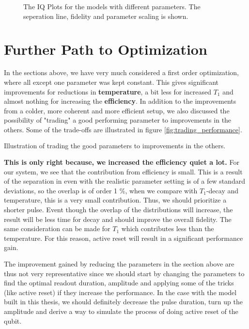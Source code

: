 \begin{figure}
    \caption{The IQ Plots for the models  with different parameters. The seperation line, fidelity and parameter scaling is shown.}
    \label{fig:budgetting_IQ_plots}
\end{figure}

\FloatBarrier

\section{Further Path to Optimization}
In the sections above, we have very much considered a first order optimization, where all except one parameter was kept constant. This gives significant improvements for reductions in \textbf{temperature}, a bit less for increased $T_1$ and almost nothing for increasing the \textbf{efficiency}. In addition to the improvements from a colder, more coherent and more efficient setup, we also discussed the possibility of "trading" a good performing parameter to improvements in the others. Some of the trade-offs are illustrated in figure \ref{fig:trading_performance}. 

\begin{marginfigure}[- 2 cm]
    \centering
    \caption{Illustration of trading the good parameters to improvements in the others. }
    \label{fig:trading_performance}
\end{marginfigure}

\textbf{This is only right because, we increased the efficiency quiet a lot.}
For our system, we see that the contribution from efficiency is small. This is a result of the separation in even with the realistic parameter setting is of a few standard deviations, so the overlap is of order 1 \%, when we compare with $T_1$-decay and temperature, this is a very small contribution. Thus, we should prioritize a shorter pulse. Event though the overlap of the distributions will increase, the result will be less time for decay and should improve the overall fidelity. The same consideration can be made for $T_1$ which contributes less than the temperature. For this reason, active reset will result in a significant performance gain. 

The improvement gained by reducing the parameters in the section above are thus not very representative since we should start by changing the parameters to find the optimal readout duration, amplitude and applying some of the tricks (like active reset) if they increase the performance. In the case with the model built in this thesis, we should definitely decrease the pulse duration, turn up the amplitude and derive a way to simulate the process of doing active reset of the qubit. 

